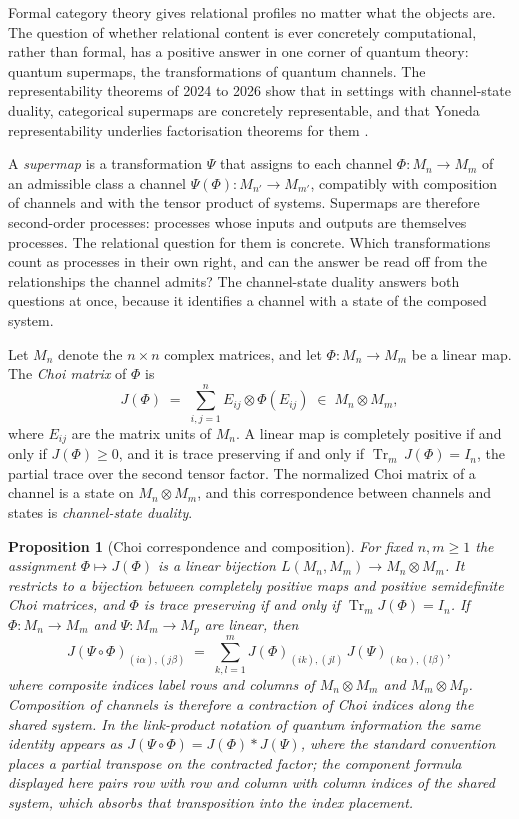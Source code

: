 \documentclass[11pt,letterpaper]{article}
\DeclareMathOperator{\Tr}{Tr}
\newtheorem{proposition}[theorem]{Proposition}
\theoremstyle{definition}
\theoremstyle{remark}
\begin{document}
Formal category theory gives relational profiles no matter what the objects are. The question of whether relational content is ever concretely computational, rather than formal, has a positive answer in one corner of quantum theory: quantum supermaps, the transformations of quantum channels. The representability theorems of 2024 to 2026 show that in settings with channel-state duality, categorical supermaps are concretely representable, and that Yoneda representability underlies factorisation theorems for them \cite{whh, hw}.

A \emph{supermap} is a transformation $\Psi$ that assigns to each channel $\Phi \colon M_n \to M_m$ of an admissible class a channel $\Psi(\Phi) \colon M_{n'} \to M_{m'}$, compatibly with composition of channels and with the tensor product of systems. Supermaps are therefore second-order processes: processes whose inputs and outputs are themselves processes. The relational question for them is concrete. Which transformations count as processes in their own right, and can the answer be read off from the relationships the channel admits? The channel-state duality answers both questions at once, because it identifies a channel with a state of the composed system.

Let $M_n$ denote the $n \times n$ complex matrices, and let $\Phi \colon M_n \to M_m$ be a linear map. The \emph{Choi matrix} of $\Phi$ \cite{choi} is
\[
J(\Phi) \;=\; \sum_{i,j=1}^{n} E_{ij} \otimes \Phi(E_{ij}) \;\in\; M_n \otimes M_m,
\]
where $E_{ij}$ are the matrix units of $M_n$. A linear map is completely positive if and only if $J(\Phi) \geq 0$, and it is trace preserving if and only if $\Tr_m\, J(\Phi) = I_n$, the partial trace over the second tensor factor. The normalized Choi matrix of a channel is a state on $M_n \otimes M_m$, and this correspondence between channels and states is \emph{channel-state duality}.

\begin{proposition}[Choi correspondence and composition]
\label{prop:choi}
For fixed $n, m \geq 1$ the assignment $\Phi \mapsto J(\Phi)$ is a linear bijection $L(M_n, M_m) \to M_n \otimes M_m$. It restricts to a bijection between completely positive maps and positive semidefinite Choi matrices, and $\Phi$ is trace preserving if and only if $\Tr_m J(\Phi) = I_n$. If $\Phi \colon M_n \to M_m$ and $\Psi \colon M_m \to M_p$ are linear, then
\begin{equation}
\label{eq:choi-comp}
J(\Psi \circ \Phi)_{(i\alpha),(j\beta)}
\;=\;
\sum_{k,l=1}^{m} J(\Phi)_{(ik),(jl)}\, J(\Psi)_{(k\alpha),(l\beta)},
\end{equation}
where composite indices label rows and columns of $M_n \otimes M_m$ and $M_m \otimes M_p$. Composition of channels is therefore a contraction of Choi indices along the shared system. In the link-product notation of quantum information the same identity appears as $J(\Psi \circ \Phi) = J(\Phi) \ast J(\Psi)$, where the standard convention places a partial transpose on the contracted factor; the component formula displayed here pairs row with row and column with column indices of the shared system, which absorbs that transposition into the index placement.
\end{proposition}
\end{document}
